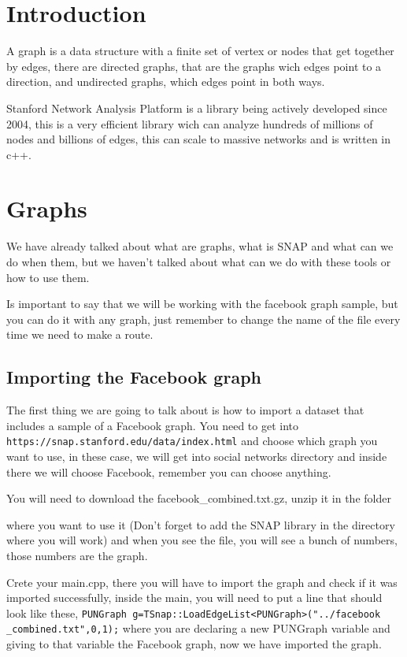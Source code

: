 \documentclass{sig-alternate-05-2015}
\begin{document}
\section{Introduction}
A graph is a data structure with a finite set of vertex or nodes
that get together by edges, there are directed graphs, that are
the graphs wich edges point to a direction, and undirected graphs,
which edges point in both ways.

Stanford Network Analysis Platform is a library being actively developed
since 2004, this is a very efficient library wich can analyze hundreds
of millions of nodes and billions of edges, this can scale to massive networks
and is written in c++.


\section{Graphs}
We have already talked about what are graphs, what is SNAP and what can
we do when them, but we haven't talked about what can we do with
these tools or how to use them.

Is important to say that we will be working with the facebook graph sample,
but you can do it with any graph, just remember to change the name of the
file every time we need to make a route.

\subsection{Importing the Facebook graph}
The first thing we are going to talk about is how to import a dataset that
includes a sample of a Facebook graph. You need to get into
\texttt{https://snap.stanford.edu/data/index.html} and choose which
graph you want to use, in these case, we will get into social networks directory
and inside there we will choose Facebook, remember you can choose anything.

You will need to download the facebook\_combined.txt.gz, unzip it in the folder

where you want to use it (Don't forget to add the SNAP library in the
directory where you will work) and when you see the file, you will see a
bunch of numbers, those numbers are the graph.

Crete your main.cpp, there you will have to import the graph and check if it was
imported successfully, inside the main, you will need to put a line that should
look like these,
\texttt{PUNGraph g=TSnap::LoadEdgeList<PUNGraph>("../facebook
\_combined.txt",0,1);}
where you are declaring a new PUNGraph variable
and giving to that variable the Facebook graph, now we have imported the graph.
\end{document}
